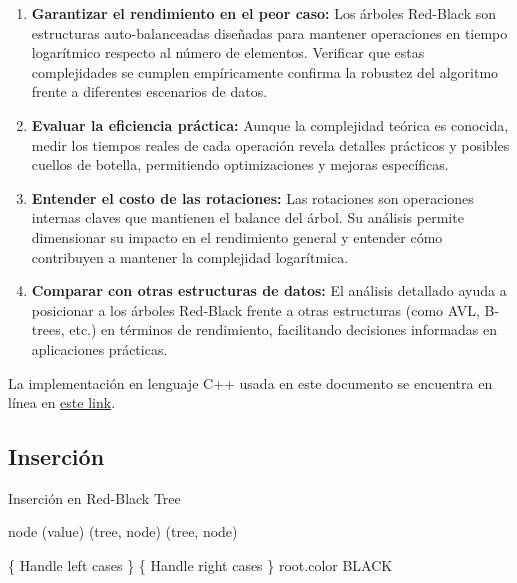 \documentclass[conference]{IEEEtran}
\begin{document}
\begin{enumerate}
    \item \textbf{Garantizar el rendimiento en el peor caso:} Los árboles Red-Black son estructuras auto-balanceadas diseñadas para mantener operaciones en tiempo logarítmico respecto al número de elementos. Verificar que estas complejidades se cumplen empíricamente confirma la robustez del algoritmo frente a diferentes escenarios de datos.
    
    \item \textbf{Evaluar la eficiencia práctica:} Aunque la complejidad teórica es conocida, medir los tiempos reales de cada operación revela detalles prácticos y posibles cuellos de botella, permitiendo optimizaciones y mejoras específicas.
    
    \item \textbf{Entender el costo de las rotaciones:} Las rotaciones son operaciones internas claves que mantienen el balance del árbol. Su análisis permite dimensionar su impacto en el rendimiento general y entender cómo contribuyen a mantener la complejidad logarítmica.
    
    \item \textbf{Comparar con otras estructuras de datos:} El análisis detallado ayuda a posicionar a los árboles Red-Black frente a otras estructuras (como AVL, B-trees, etc.) en términos de rendimiento, facilitando decisiones informadas en aplicaciones prácticas.
\newpage

\end{enumerate}
La implementación en lenguaje C++ usada en este documento se encuentra en línea en \href{https://github.com/stiffis/aed-exercises/tree/main/proyectRedBlackTree}{este link}.
\subsection{Inserción}\label{AA}

\begin{algorithm}
\caption{Inserción en Red-Black Tree}
\begin{algorithmic}[1]
    \State node \textleftarrow {}(value)
    \State {}(tree, node)
    \State {}(tree, node)
\EndProcedure

            \State \{ Handle left cases \}
        \Else
            \State \{ Handle right cases \}
        \EndIf
    \EndWhile
    \State root.color \textleftarrow BLACK
\EndProcedure
\end{algorithmic}
\end{algorithm}
\end{document}

